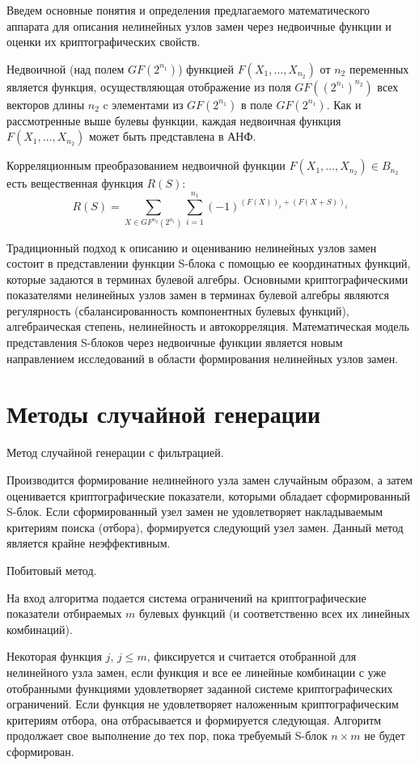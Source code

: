 Введем основные понятия и определения предлагаемого математического аппарата для
описания нелинейных узлов замен через недвоичные функции и оценки их
криптографических свойств.

Недвоичной (над полем $GF(2^{n_1})$) функцией $F(X_1, \ldots, X_{n_2})$ от $n_2$
переменных является функция, осуществляющая отображение из поля
$GF((2^{n_1})^{n_2})$ всех векторов длины $n_2$ c элементами из $GF(2^{n_1})$ в
поле $GF(2^{n_1})$. Как и рассмотренные выше булевы функции, каждая недвоичная
функция $F(X_1, \ldots, X_{n_2})$ может быть представлена в АНФ.

Корреляционным преобразованием недвоичной функции $F(X_1, \ldots, X_{n_2}) \in
B_{n_2}$ есть вещественная функция $R(S)$:
\begin{equation}R(S) = \sum_{X \in
GF^{n_2}(2^{n_1})}{\sum^{n_1}_{i=1}{(-1)^{(F(X))_i + (F(X+S))_i}}}\end{equation}

Традиционный подход к описанию и оцениванию нелинейных узлов замен состоит в
представлении функции S-блока с помощью ее координатных функций, которые
задаются в терминах булевой алгебры. Основными криптографическими показателями
нелинейных узлов замен в терминах булевой алгебры являются регулярность
(сбалансированность компонентных булевых функций), алгебраическая степень,
нелинейность и автокорреляция. Математическая модель представления S-блоков
через недвоичные функции является новым направлением исследований в области
формирования нелинейных узлов замен.

\section{Методы случайной генерации}

Метод случайной генерации с фильтрацией.

Производится формирование нелинейного узла замен случайным образом, а затем
оценивается криптографические показатели, которыми обладает сформированный
S-блок. Если сформированный узел замен не удовлетворяет накладываемым критериям
поиска (отбора), формируется следующий узел замен. Данный метод является крайне
неэффективным.

Побитовый метод.

На вход алгоритма подается система ограничений на криптографические показатели
отбираемых $m$ булевых функций (и соответственно всех их линейных комбинаций).

Некоторая функция $j$, $j \leq m$, фиксируется и считается отобранной для
нелинейного узла замен, если функция и все ее линейные комбинации с уже
отобранными функциями удовлетворяет заданной системе криптографических
ограничений. Если функция не удовлетворяет наложенным криптографическим
критериям отбора, она отбрасывается и формируется следующая. Алгоритм продолжает
свое выполнение до тех пор, пока требуемый S-блок $n \times m$ не будет сформирован.

